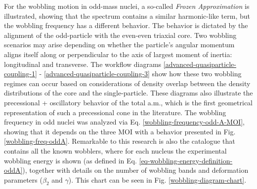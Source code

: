 For the wobbling motion in odd-mass nuclei, a so-called \emph{Frozen Approximation} is illustrated, showing that the spectrum contains a similar harmonic-like term, but the wobbling frequency has a different behavior. The behavior is dictated by the alignment of the odd-particle with the even-even triaxial core. Two wobbling scenarios may arise depending on whether the particle’s angular momentum aligns itself along or perpendicular to the axis of largest moment of inertia: longitudinal and transverse. The workflow diagrams \ref{advanced-quasiparticle-coupling-1} - \ref{advanced-quasiparticle-coupling-3} show how these two wobbling regimes can occur based on considerations of density overlap between the density distributions of the core and the single-particle. These diagrams also illustrate the precessional + oscillatory behavior of the total a.m., which is the first geometrical representation of such a precessional cone in the literature. The wobbling frequency in odd nuclei was analyzed via Eq. \ref{wobbling-frequency-odd-A-MOI}, showing that it depends on the three MOI with a behavior presented in Fig. \ref{wobbling-freq-oddA}. Remarkable to this research is also the catalogue that contains all the known wobblers, where for each nucleus the experimental wobbling energy is shown (as defined in Eq. \ref{eq-wobbling-energy-definition-oddA}), together with details on the number of wobbling bands and deformation parameters ($\beta_2$ and $\gamma$). This chart can be seen in Fig. \ref{wobbling-diagram-chart}.

